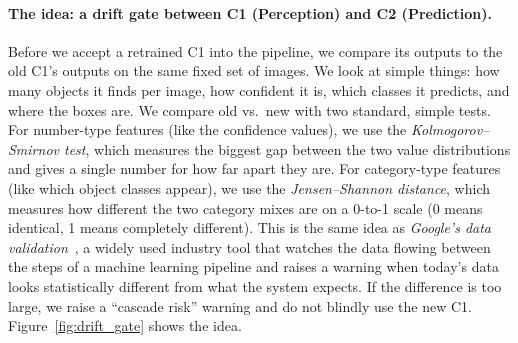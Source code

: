 \documentclass[11pt,a4paper]{article}
\begin{document}
\paragraph{The idea: a drift gate between C1 (Perception) and C2 (Prediction).}
Before we accept a retrained C1 into the pipeline, we compare its outputs
to the old C1's outputs on the same fixed set of images. We look at simple
things: how many objects it finds per image, how confident it is, which
classes it predicts, and where the boxes are. We compare old vs.\ new
with two standard, simple tests. For number-type features (like the
confidence values), we use the \emph{Kolmogorov--Smirnov test}, which
measures the biggest gap between the two value distributions and gives a
single number for how far apart they are. For category-type features (like
which object classes appear), we use the \emph{Jensen--Shannon distance},
which measures how different the two category mixes are on a 0-to-1 scale
(0 means identical, 1 means completely different). This is the same idea
as \emph{Google's data validation}~\cite{breck2019data}, a widely used
industry tool that watches the data flowing between the steps of a machine
learning pipeline and raises a warning when today's data looks
statistically different from what the system expects. If the difference is
too large, we raise a ``cascade risk'' warning and do not blindly use the
new C1. Figure~\ref{fig:drift_gate} shows the idea.
\end{document}

